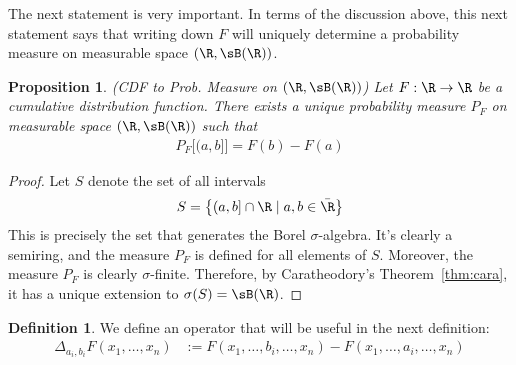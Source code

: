 \documentclass[12pt]{article}
\theoremstyle{plain}
\newtheorem{prop}[thm]{Proposition}
\theoremstyle{definition}
\newtheorem{defn}[thm]{Definition}
\theoremstyle{remark}
\newcommand{\ra}{\rightarrow}
\begin{document}
The next statement is very important. In terms of the discussion above,
this next statement says that writing down $F$ will uniquely determine a
probability measure on measurable space $(\R,\sB(\R))$.

\begin{prop}\emph{(CDF to Prob. Measure on $(\R,\sB(\R))$)}
Let $F:\R\ra\R$ be a cumulative distribution function. There exists a
\emph{unique} probability measure $P_F$ on measurable space
$(\R,\sB(\R))$ such that
\begin{align*}
  P_F\big[(a,b]\big] = F(b)-F(a)
\end{align*}
\end{prop}
\begin{proof}
Let $S$ denote the set of all intervals
\begin{align*}
  S = \left\{ (a,b] \cap \R \;|\; a,b\in\bar{\R}\right\}
\end{align*}
This is precisely the set that generates the Borel $\sigma$-algebra.
It's clearly a semiring, and the measure $P_F$ is defined for all
elements of $S$.
Moreover, the measure $P_F$ is clearly $\sigma$-finite. Therefore,
by Caratheodory's Theorem~\ref{thm:cara}, it has a unique extension to
$\sigma(S)=\sB(\R)$.
\end{proof}


\begin{defn}
We define an operator that will be useful in the next definition:
\begin{align*}
  \Delta_{a_i,b_i} F(x_1,\ldots,x_n)
  &:= F(x_1,\ldots,b_i,\ldots,x_n)
  - F(x_1,\ldots,a_i,\ldots,x_n)
\end{align*}
\end{defn}
\end{document}
